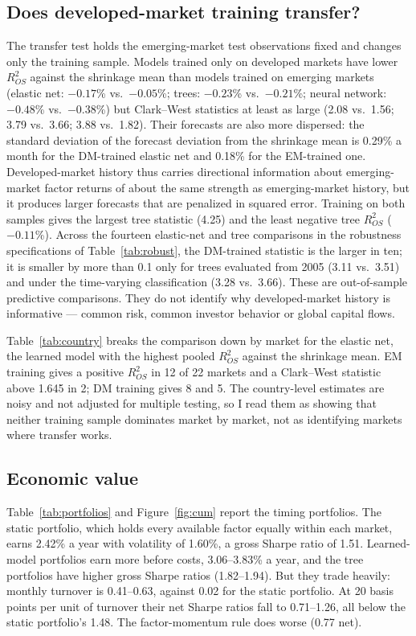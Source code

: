 \documentclass[11pt]{article}
\begin{document}


\subsection{Does developed-market training transfer?}
The transfer test holds the emerging-market test observations fixed and changes only the training sample. Models trained only on developed markets have lower $R^2_{OS}$ against the shrinkage mean than models trained on emerging markets (elastic net: $-0.17$\% vs.\ $-0.05$\%; trees: $-0.23$\% vs.\ $-0.21$\%; neural network: $-0.48$\% vs.\ $-0.38$\%) but Clark--West statistics at least as large (2.08 vs.\ 1.56; 3.79 vs.\ 3.66; 3.88 vs.\ 1.82). Their forecasts are also more dispersed: the standard deviation of the forecast deviation from the shrinkage mean is 0.29\% a month for the DM-trained elastic net and 0.18\% for the EM-trained one. Developed-market history thus carries directional information about emerging-market factor returns of about the same strength as emerging-market history, but it produces larger forecasts that are penalized in squared error. Training on both samples gives the largest tree statistic (4.25) and the least negative tree $R^2_{OS}$ ($-0.11$\%). Across the fourteen elastic-net and tree comparisons in the robustness specifications of Table~\ref{tab:robust}, the DM-trained statistic is the larger in ten; it is smaller by more than 0.1 only for trees evaluated from 2005 (3.11 vs.\ 3.51) and under the time-varying classification (3.28 vs.\ 3.66). These are out-of-sample predictive comparisons. They do not identify why developed-market history is informative --- common risk, common investor behavior or global capital flows.

Table~\ref{tab:country} breaks the comparison down by market for the elastic net, the learned model with the highest pooled $R^2_{OS}$ against the shrinkage mean. EM training gives a positive $R^2_{OS}$ in 12 of 22 markets and a Clark--West statistic above 1.645 in 2; DM training gives 8 and 5. The country-level estimates are noisy and not adjusted for multiple testing, so I read them as showing that neither training sample dominates market by market, not as identifying markets where transfer works.



\subsection{Economic value}
Table~\ref{tab:portfolios} and Figure~\ref{fig:cum} report the timing portfolios. The static portfolio, which holds every available factor equally within each market, earns 2.42\% a year with volatility of 1.60\%, a gross Sharpe ratio of 1.51. Learned-model portfolios earn more before costs, 3.06--3.83\% a year, and the tree portfolios have higher gross Sharpe ratios (1.82--1.94). But they trade heavily: monthly turnover is 0.41--0.63, against 0.02 for the static portfolio. At 20 basis points per unit of turnover their net Sharpe ratios fall to 0.71--1.26, all below the static portfolio's 1.48. The factor-momentum rule does worse (0.77 net).
\end{document}
